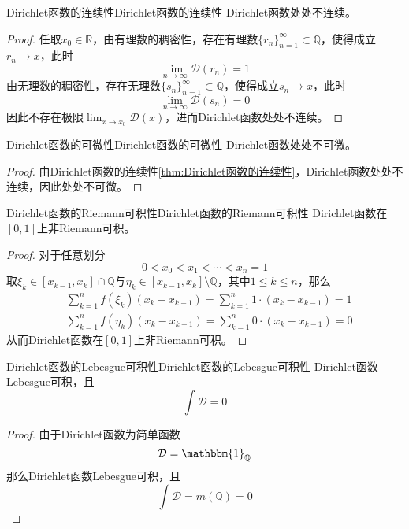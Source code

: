 \documentclass[lang = cn, scheme = chinese, thmcnt = section]{elegantbook}
\newcommand{\R}{\mathbb{R}}            %
\newcommand{\Q}{\mathbb{Q}}            %
\newcommand{\sub}{\subset}             %
\begin{document}
\begin{theorem}{Dirichlet函数的连续性}{Dirichlet函数的连续性}
	Dirichlet函数处处不连续。
\end{theorem}

\begin{proof}
	任取$x_0\in \R$，由有理数的稠密性，存在有理数$\{r_n\}_{n=1}^{\infty}\sub\Q$，使得成立$r_n\to x$，此时
	$$
	\lim_{n\to\infty}\mathcal{D}(r_n)=1
	$$
	由无理数的稠密性，存在无理数$\{s_n\}_{n=1}^{\infty}\sub\Q$，使得成立$s_n\to x$，此时
	$$
	\lim_{n\to\infty}\mathcal{D}(s_n)=0
	$$
	因此不存在极限$\displaystyle\lim_{x\to x_0}\mathcal{D}(x)$，进而Dirichlet函数处处不连续。
\end{proof}

\begin{theorem}{Dirichlet函数的可微性}{Dirichlet函数的可微性}
	Dirichlet函数处处不可微。
\end{theorem}

\begin{proof}
	由Dirichlet函数的连续性\ref{thm:Dirichlet函数的连续性}，Dirichlet函数处处不连续，因此处处不可微。
\end{proof}

\begin{theorem}{Dirichlet函数的Riemann可积性}{Dirichlet函数的Riemann可积性}
	Dirichlet函数在$[0,1]$上非Riemann可积。
\end{theorem}

\begin{proof}
	对于任意划分
	$$
	0<x_0<x_1<\cdots<x_n=1
	$$
	取$\xi_k\in [x_{k-1},x_k]\cap \Q$与$\eta_k\in [x_{k-1},x_k]\setminus \Q$，其中$1\le k \le n$，那么
	\begin{align*}
		& \sum_{k=1}^{n}f(\xi_k)(x_k-x_{k-1})
		=\sum_{k=1}^{n}1\cdot (x_k-x_{k-1})
		=1\\
		& \sum_{k=1}^{n}f(\eta_k)(x_k-x_{k-1})
		=\sum_{k=1}^{n}0\cdot (x_k-x_{k-1})
		=0
	\end{align*}
	从而Dirichlet函数在$[0,1]$上非Riemann可积。
\end{proof}

\begin{theorem}{Dirichlet函数的Lebesgue可积性}{Dirichlet函数的Lebesgue可积性}
	Dirichlet函数Lebesgue可积，且
	$$
	\int \mathcal{D}=0
	$$
\end{theorem}

\begin{proof}
	由于Dirichlet函数为简单函数
	$$
	\mathcal{D}=\mathbbm{1}_\Q
	$$
	那么Dirichlet函数Lebesgue可积，且
	$$
	\int \mathcal{D}=m(\Q)=0
	$$
\end{proof}
\end{document}
